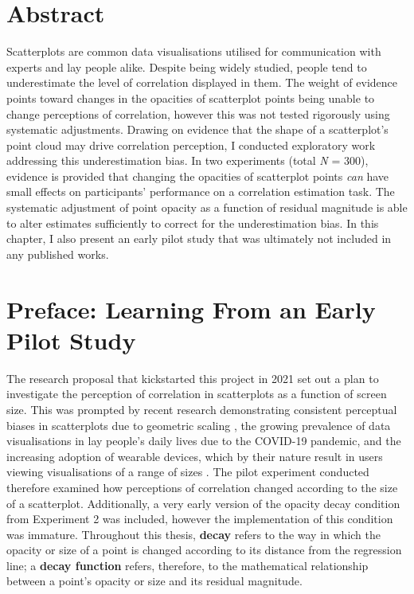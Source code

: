 \documentclass[../main.tex]{subfiles}
\begin{document}
\section{Abstract}\label{abstract-adjusting-opacity}

Scatterplots are common data visualisations utilised for communication
with experts and lay people alike. Despite being widely studied, people
tend to underestimate the level of correlation displayed in them. The
weight of evidence points toward changes in the opacities of scatterplot
points being unable to change perceptions of correlation, however this
was not tested rigorously using systematic adjustments. Drawing on
evidence that the shape of a scatterplot's point cloud may drive
correlation perception, I conducted exploratory work addressing this
underestimation bias. In two experiments (total \emph{N} = 300),
evidence is provided that changing the opacities of scatterplot points
\emph{can} have small effects on participants' performance on a
correlation estimation task. The systematic adjustment of point opacity
as a function of residual magnitude is able to alter estimates
sufficiently to correct for the underestimation bias. In this chapter, I
also present an early pilot study that was ultimately not included in
any published works.

\section{Preface: Learning From an Early Pilot Study}\label{pilot-study}

The research proposal that kickstarted this project in 2021 set out a
plan to investigate the perception of correlation in scatterplots as a
function of screen size. This was prompted by recent research
demonstrating consistent perceptual biases in scatterplots due to
geometric scaling \cite{wei_2020}, the growing prevalence of data
visualisations in lay people's daily lives due to the COVID-19 pandemic,
and the increasing adoption of wearable devices, which by their nature
result in users viewing visualisations of a range of sizes
\cite{shandhi_2024}. The pilot experiment conducted therefore examined
how perceptions of correlation changed according to the size of a
scatterplot. Additionally, a very early version of the opacity decay
condition from Experiment 2 was included, however the implementation of
this condition was immature. Throughout this thesis, \textbf{decay}
refers to the way in which the opacity or size of a point is changed
according to its distance from the regression line; a \textbf{decay
function} refers, therefore, to the mathematical relationship between a
point's opacity or size and its residual magnitude.
\end{document}
